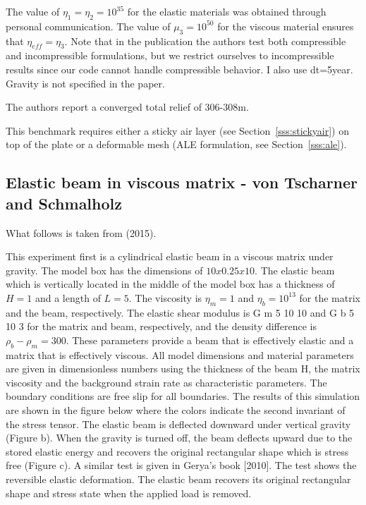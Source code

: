 The value of $\eta_1=\eta_2=10^{35}$ for the elastic materials was obtained through personal communication. 
The value of $\mu_3=10^{50}$ for the viscous material ensures that $\eta_{eff}=\eta_3$.
Note that in the publication the authors test both compressible and incompressible 
formulations, but we restrict ourselves to incompressible results since our code cannot handle compressible behavior. 
I also use dt=5year.
Gravity is not specified in the paper.

The authors report a converged total relief of 306-308m.

This benchmark requires either a sticky air layer (see Section~\ref{sss:stickyair})
on top of the plate or a deformable mesh (ALE formulation, see Section~\ref{sss:ale}).



\subsection{Elastic beam in viscous matrix - von Tscharner and Schmalholz}


What follows is taken from \textcite{vosc15} (2015).

This experiment first is a cylindrical elastic beam in a viscous matrix under gravity. 
The model box has the dimensions of $10x0.25x10$. The elastic beam which is vertically 
located in the middle of the model box has a thickness of $H=1$ and a length of $L=5$. 
The viscosity is $\eta_m=1$ and $\eta_b=10^{13}$ for the matrix and the beam, respectively. 
The elastic shear modulus is G m 5 10 10 and G b 5 10 3 for the matrix and beam, 
respectively, and the density difference is $\rho_b-\rho_m=300$. These
parameters provide a beam that is effectively elastic and a matrix that 
is effectively viscous. All model dimensions and material parameters are given in 
dimensionless numbers using the thickness of the beam H, the matrix viscosity and 
the background strain rate as characteristic parameters. The
boundary conditions are free slip for all boundaries. The results of this 
simulation are shown in the figure below where the colors indicate the second 
invariant of the stress tensor. The elastic beam is
deflected downward under vertical gravity (Figure b). When the gravity is turned off, the beam
deflects upward due to the stored elastic energy and recovers the original rectangular 
shape which is stress free (Figure c). A similar test is given in Gerya's book [2010]. 
The test shows the reversible elastic deformation. The elastic beam recovers its original rectangular shape and stress state when the applied load is removed.

